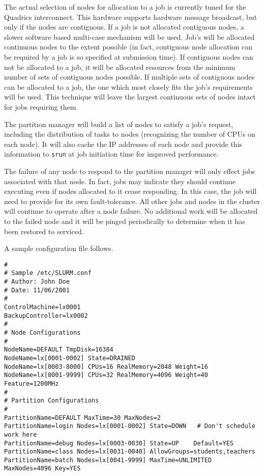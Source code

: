 The actual selection of nodes for allocation to a job is currently
tuned for the Quadrics interconnect.  This hardware supports hardware
message broadcast, but only if the nodes are contiguous.  If a job
is not allocated contiguous nodes, a slower software based multi-case
mechanism will be used.  Job's will be allocated continuous nodes to the
extent possible (in fact, contiguous node allocation can be required
by a job is so specified at submission time).  If contiguous nodes
can not be allocated to a job, it will be allocated resources from
the minimum number of sets of contiguous nodes possible.  If multiple
sets of contiguous nodes can be allocated to a job, the one which most
closely fits the job's requirements will be used.  This technique will
leave the largest continuous sets of nodes intact for jobs requiring them.

The partition manager will build a list of nodes to satisfy a job's
request, including the distribution of tasks to nodes (recognizing the
number of CPUs on each node).  It will also cache the IP addresses of
each node and provide this information to {\tt srun} at job initiation
time for improved performance.

The failure of any node to respond to the partition manager will only
effect jobs associated with that node.  In fact, jobs may indicate they
should continue executing even if nodes allocated to it cease responding.
In this case, the job will need to provide for its own fault-tolerance.
All other jobs and nodes in the cluster will continue to operate after
a node failure.  No additional work will be allocated to the failed
node and it will be pinged periodically to determine when it has been
restored to serviced.

A sample configuration file follows.

\begin{verbatim}
# 
# Sample /etc/SLURM.conf
# Author: John Doe
# Date: 11/06/2001
#
ControlMachine=lx0001
BackupController=lx0002
#
# Node Configurations
#
NodeName=DEFAULT TmpDisk=16384
NodeName=lx[0001-0002] State=DRAINED
NodeName=lx[0003-8000] CPUs=16 RealMemory=2048 Weight=16
NodeName=lx[8001-9999] CPUs=32 RealMemory=4096 Weight=40 Feature=1200MHz
#
# Partition Configurations
#
PartitionName=DEFAULT MaxTime=30 MaxNodes=2
PartitionName=login Nodes=lx[0001-0002] State=DOWN   # Don't schedule work here
PartitionName=debug Nodes=lx[0003-0030] State=UP    Default=YES
PartitionName=class Nodes=lx[0031-0040] AllowGroups=students,teachers
PartitionName=batch Nodes=lx[0041-9999] MaxTime=UNLIMITED MaxNodes=4096 Key=YES
\end{verbatim}

